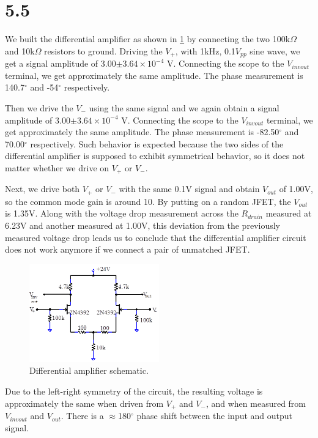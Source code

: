 \documentclass[authoryear, 12pt,5p, times]{elsarticle}
\begin{document}
\section*{5.5}
 We built the differential amplifier as shown in \ref{q5setup} by connecting the two 100k$\Omega$ and 10k$\Omega$ resistors to ground. Driving the $V_+$, with 1kHz, 0.1$V_{pp}$ sine wave, we get a signal amplitude of 3.00$\pm3.64\times10^{-4}$ V. Connecting the scope to the $V_{invout}$ terminal, we get approximately the same amplitude. The phase measurement is 140.7$^{\circ}$  and -54$^{\circ}$  respectively.
 \par Then we drive the $V_-$ using the same signal and we again obtain a signal amplitude of 3.00$\pm3.64\times10^{-4}$ V. Connecting the scope to the $V_{invout}$ terminal, we get approximately the same amplitude. The phase measurement is -82.50$^{\circ}$ and 70.00$^{\circ}$  respectively. Such behavior is expected because the two sides of the differential amplifier is supposed to exhibit symmetrical behavior, so it does not matter whether we drive on $V_{+}$ or $V_{-}$.
 \par Next, we drive both $V_{+}$ or $V_{-}$ with the same 0.1V signal and obtain $V_{out}$ of 1.00V, so the common mode gain is around 10. By putting on a random JFET, the $V_{out}$ is 1.35V. Along with the voltage drop measurement across the $R_{drain}$ measured at 6.23V and another measured at 1.00V, this deviation from the previously measured voltage drop leads us to conclude that the differential amplifier circuit does not work anymore if we connect a pair of unmatched JFET.
 \begin{figure}[h!]
 \centering
 \includegraphics[width=0.5\textwidth]{figure/q5setup}
\caption{Differential amplifier schematic.}
\label{q5setup}
 \end{figure}
 \par Due to the left-right symmetry of the circuit, the resulting voltage is approximately the same when driven from $V_+$ and $V_-$, and when measured from $V_{invout}$ and $V_{out}$. There is a $\approx$180$^{\circ}$  phase shift between the input and output signal.
\end{document}
